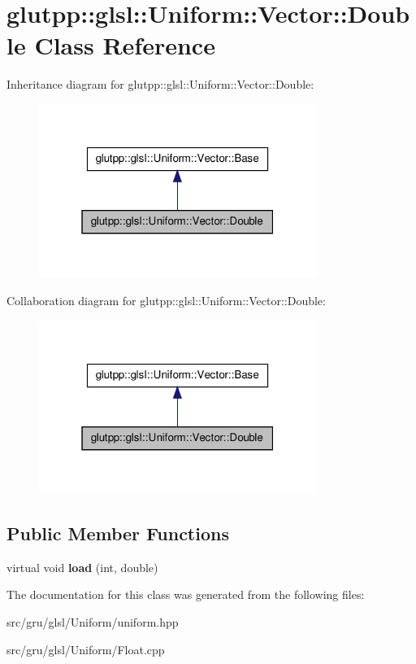 \hypertarget{classglutpp_1_1glsl_1_1Uniform_1_1Vector_1_1Double}{\section{glutpp\-:\-:glsl\-:\-:\-Uniform\-:\-:\-Vector\-:\-:\-Double \-Class \-Reference}
\label{classglutpp_1_1glsl_1_1Uniform_1_1Vector_1_1Double}
}


\-Inheritance diagram for glutpp\-:\-:glsl\-:\-:\-Uniform\-:\-:\-Vector\-:\-:\-Double\-:
\nopagebreak
\begin{figure}[H]
\begin{center}
\leavevmode
\includegraphics[width=256pt]{classglutpp_1_1glsl_1_1Uniform_1_1Vector_1_1Double__inherit__graph}
\end{center}
\end{figure}


\-Collaboration diagram for glutpp\-:\-:glsl\-:\-:\-Uniform\-:\-:\-Vector\-:\-:\-Double\-:
\nopagebreak
\begin{figure}[H]
\begin{center}
\leavevmode
\includegraphics[width=256pt]{classglutpp_1_1glsl_1_1Uniform_1_1Vector_1_1Double__coll__graph}
\end{center}
\end{figure}
\subsection*{\-Public \-Member \-Functions}
\begin{DoxyCompactItemize}
\item 
\hypertarget{classglutpp_1_1glsl_1_1Uniform_1_1Vector_1_1Double_a36ccba58e251e22e3bffa875ae4491fc}{virtual void {\bfseries load} (int, double)}\label{classglutpp_1_1glsl_1_1Uniform_1_1Vector_1_1Double_a36ccba58e251e22e3bffa875ae4491fc}

\end{DoxyCompactItemize}


\-The documentation for this class was generated from the following files\-:\begin{DoxyCompactItemize}
\item 
src/gru/glsl/\-Uniform/uniform.\-hpp\item 
src/gru/glsl/\-Uniform/\-Float.\-cpp\end{DoxyCompactItemize}
